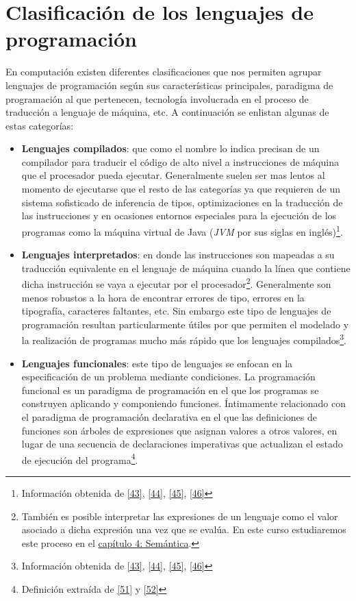 \section{Clasificación de los lenguajes de programación}

    En computación existen diferentes clasificaciones que nos permiten agrupar lenguajes de programación según sus características principales, paradigma de programación al que pertenecen, tecnología involucrada en el proceso de traducción a lenguaje de máquina, etc. A continuación se enlistan algunas de estas categorías: 

    \begin{itemize}
        \item \textbf{Lenguajes compilados}:  que como el nombre lo indica precisan de un compilador para traducir el código de alto nivel a instrucciones de máquina que el procesador pueda ejecutar. Generalmente suelen ser mas lentos al momento de ejecutarse que el resto de las categorías  ya que requieren de un sistema sofisticado de inferencia de tipos, optimizaciones en la traducción de las instrucciones y en ocasiones entornos especiales para la ejecución de los programas como la máquina virtual de Java (\textit{JVM} por sus siglas en inglés)\footnote{Información obtenida de \hyperlink{43}{[43]}, \hyperlink{44}{[44]}, \hyperlink{45}{[45]}, \hyperlink{46}{[46]}}.\\

        \item \textbf{Lenguajes interpretados}: en donde las instrucciones son mapeadas a su traducción equivalente en el lenguaje de máquina cuando la línea que contiene dicha instrucción se vaya a ejecutar por el procesador\footnote{También es posible interpretar las expresiones de un lenguaje como el valor asociado a dicha expresión una vez que se evalúa. En este curso estudiaremos este proceso en el \hyperref[sec:semantics]{capítulo 4: Semántica}.}. Generalmente son menos robustos a la hora de encontrar errores de tipo, errores en la tipografía, caracteres faltantes, etc. Sin embargo este tipo de lenguajes de programación resultan particularmente útiles por que permiten el modelado y la realización de programas mucho más rápido que los lenguajes compilados\footnote{Información obtenida de \hyperlink{43}{[43]}, \hyperlink{44}{[44]}, \hyperlink{45}{[45]}, \hyperlink{46}{[46]}}.\\

        \item \textbf{Lenguajes funcionales}: este tipo de lenguajes se enfocan en la especificación de un problema mediante condiciones. 
         La programación funcional es un paradigma de programación en el que los programas se construyen aplicando y componiendo funciones. Íntimamente relacionado con el paradigma de programación declarativa en el que las definiciones de funciones son árboles de expresiones que asignan valores a otros valores, en lugar de una secuencia de declaraciones imperativas que actualizan el estado de ejecución del programa\footnote{Definición extraída de \hyperlink{51}{[51]} y \hyperlink{52}{[52]}}.\\


\end{itemize}

